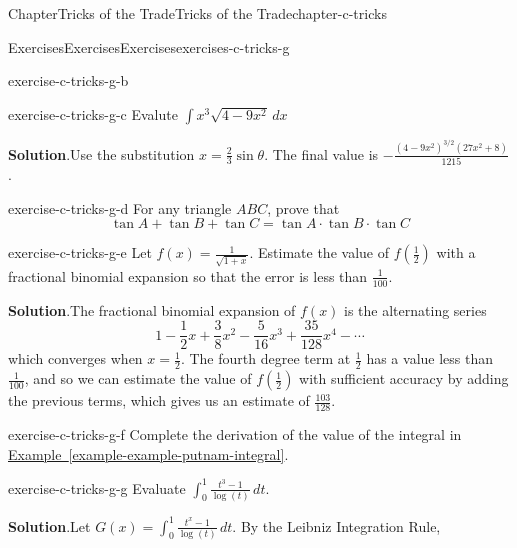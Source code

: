 \documentclass[oneside,10pt,]{book}
\newcommand{\blocktitlefont}{\relax}
\newcommand{\xreffont}{\relax}
\numberwithin{equation}{section}
\begin{document}
\begin{chapterptx}{Chapter}{Tricks of the Trade}{}{Tricks of the Trade}{}{}{chapter-c-tricks}
\begin{exercises-section}{Exercises}{Exercises}{}{Exercises}{}{}{exercises-c-tricks-g}
\begin{divisionexercise}{1}{}{}{exercise-c-tricks-g-b}
\end{divisionexercise}%
\begin{divisionexercise}{2}{}{}{exercise-c-tricks-g-c}%
Evalute \(\int x^3 \sqrt{4-9x^2} \, dx\)%
\par\smallskip%
\noindent\textbf{\blocktitlefont Solution}.\hypertarget{solution-c-tricks-g-c-b}{}\quad{}Use the substitution \(x = \frac{2}{3} \sin{\theta}\).  The final value is \(-\frac{\left(4-9 x^2\right)^{3/2}
\left(27 x^2+8\right)}{1215}\).%
\end{divisionexercise}%
\begin{divisionexercise}{3}{}{}{exercise-c-tricks-g-d}%
For any triangle \(ABC\), prove that%
\begin{equation*}
\tan{A}+\tan{B}+\tan{C} = \tan{A}\cdot \tan{B}\cdot \tan{C}
\end{equation*}
%
\end{divisionexercise}%
\begin{divisionexercise}{4}{}{}{exercise-c-tricks-g-e}%
Let \(f(x)=\frac{1}{\sqrt{1+x}}\).  Estimate the value of \(f(\frac{1}{2})\) with a fractional binomial expansion so that the error is less than \(\frac{1}{100}\).%
\par\smallskip%
\noindent\textbf{\blocktitlefont Solution}.\hypertarget{solution-c-tricks-g-e-b}{}\quad{}The fractional binomial expansion of \(f(x)\) is the alternating series%
\begin{equation*}
1 - \frac{1}{2} x +  \frac{3}{8} x^2- \frac{5}{16} x^3 +  \frac{35}{128} x^4 - \cdots 
\end{equation*}
which converges when \(x=\frac{1}{2}\).   The fourth degree term at \(\frac{1}{2}\) has a value less than \(\frac{1}{100}\), and so we can estimate the value of \(f(\frac{1}{2})\) with sufficient accuracy by adding the previous terms, which gives us an estimate of \(\frac{103}{128}\).%
\end{divisionexercise}%
\begin{divisionexercise}{5}{}{}{exercise-c-tricks-g-f}%
Complete the derivation of the value of the integral in \hyperref[example-example-putnam-integral]{Example~{\xreffont\ref{example-example-putnam-integral}}}.%
\end{divisionexercise}%
\begin{divisionexercise}{6}{}{}{exercise-c-tricks-g-g}%
Evaluate \(\int_0^1 \frac{t^3-1}{\log (t)} \, dt\).%
\par\smallskip%
\noindent\textbf{\blocktitlefont Solution}.\hypertarget{solution-c-tricks-g-g-b}{}\quad{}Let \(G(x)=\int_0^1 \frac{t^x-1}{\log (t)} \, dt \). By the Leibniz Integration Rule,%

\end{divisionexercise}
\end{exercises-section}
\end{chapterptx}
\end{document}
